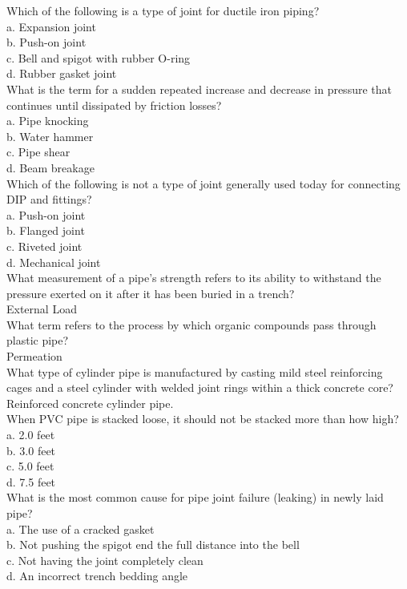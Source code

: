 Which of the following is a type of joint for ductile iron piping?\\
a.	Expansion joint\\
b.	Push-on joint\\
c.	Bell and spigot with rubber O-ring\\
d.	Rubber gasket joint\\
What is the term for a sudden repeated increase and decrease in pressure that continues until dissipated by friction losses?\\
a.	Pipe knocking\\
b.	Water hammer\\
c.	Pipe shear\\
d.	Beam breakage\\
Which of the following is not a type of joint generally used today for connecting DIP and fittings?\\
a.	Push-on joint\\
b.	Flanged joint\\
c.	Riveted joint\\
d.	Mechanical joint\\
What measurement of a pipe's strength refers to its ability to withstand the pressure exerted on it after it has been buried in a trench?\\
External Load\\
What term refers to the process by which organic compounds pass through plastic pipe?\\
Permeation\\
What type of cylinder pipe is manufactured by casting mild steel reinforcing cages and a steel cylinder with welded joint rings within a thick concrete core?\\
Reinforced concrete cylinder pipe.\\
When PVC pipe is stacked loose, it should not be stacked more than how high?\\
a.	2.0 feet\\
b.	3.0 feet\\
c.	5.0 feet\\
d.	7.5 feet\\
What is the most common cause for pipe joint failure (leaking) in newly laid pipe?\\
a.	The use of a cracked gasket\\
b.	Not pushing the spigot end the full distance into the bell\\
c.	Not having the joint completely clean\\
d.	An incorrect trench bedding angle\\
